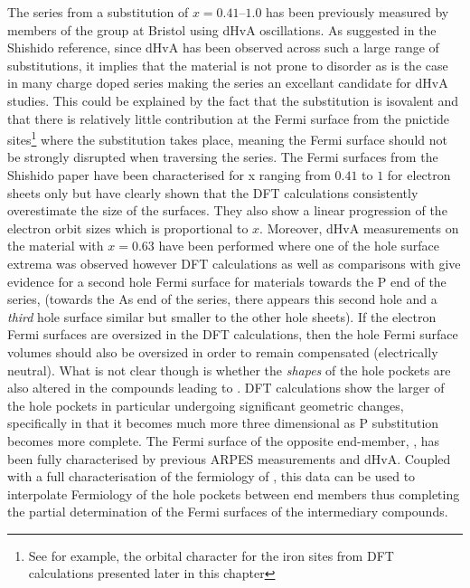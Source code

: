 The \BaFePAs series from a substitution of $x=0.41$--$1.0$ has been previously measured by members of the group at Bristol using dHvA oscillations\cite{Shishido2010}. As suggested in the Shishido reference, since dHvA has been observed across such a large range of substitutions, it implies that the material is not prone to disorder as is the case in many charge doped series  making the series an excellant candidate for dHvA studies. This could be explained by the fact that the substitution is isovalent and that there is relatively little contribution at the Fermi surface from the pnictide sites\footnote{See for example, the orbital character for the iron sites from \ac{DFT} calculations presented later in this chapter} where the substitution takes place, meaning the Fermi surface should not be strongly disrupted when traversing the series. The Fermi surfaces from the Shishido paper have been characterised for x ranging from $0.41$ to $1$ for electron sheets only but have clearly shown that the DFT calculations consistently overestimate the size of the surfaces. They also show a linear progression of the electron orbit sizes which is proportional to $x$. Moreover, dHvA measurements on the material with $x=0.63$ have been performed where one of the hole surface extrema was observed\cite{Analytis2010c} however DFT calculations as well as comparisons with \SrFeP\cite{Analytis2009} give evidence for a second hole Fermi surface for materials towards the P end of the series, (towards the As end of the series, there appears this second hole and a \emph{third} hole surface similar but smaller to the other hole sheets). If the electron Fermi surfaces are oversized in the DFT calculations, then the hole Fermi surface volumes should also be oversized in order to remain compensated (electrically neutral). What is not clear though is whether the \emph{shapes} of the hole pockets are also altered in the compounds leading to \BaFeP. DFT calculations show the larger of the hole pockets in particular undergoing significant geometric changes, specifically in that it becomes much more three dimensional as P substitution becomes more complete. The Fermi surface of the opposite end-member, \BaFeAs, has been fully characterised by previous ARPES measurements\cite{Kondo2010a} and dHvA\cite{Terashima2011, Analytis2010b}. Coupled with a full characterisation of the fermiology of \BaFeP, this data can be used to interpolate Fermiology of the hole pockets between end members thus completing the partial determination of the Fermi surfaces of the intermediary compounds.

